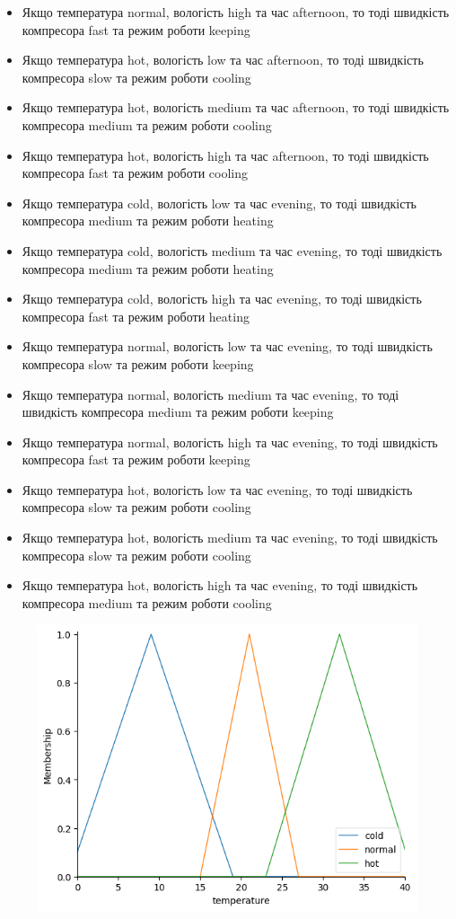 \documentclass{article}
\begin{document}
\begin{itemize}
        \item Якщо температура normal, вологість high та час afternoon, то тоді швидкість компресора fast та режим роботи keeping
        \item Якщо температура hot, вологість low та час afternoon, то тоді швидкість компресора slow та режим роботи cooling
        \item Якщо температура hot, вологість medium та час afternoon, то тоді швидкість компресора medium та режим роботи cooling
        \item Якщо температура hot, вологість high та час afternoon, то тоді швидкість компресора fast та режим роботи cooling
        \item Якщо температура cold, вологість low та час evening, то тоді швидкість компресора medium та режим роботи heating
        \item Якщо температура cold, вологість medium та час evening, то тоді швидкість компресора medium та режим роботи heating
        \item Якщо температура cold, вологість high та час evening, то тоді швидкість компресора fast та режим роботи heating
        \item Якщо температура normal, вологість low та час evening, то тоді швидкість компресора slow та режим роботи keeping
        \item Якщо температура normal, вологість medium та час evening, то тоді швидкість компресора medium та режим роботи keeping
        \item Якщо температура normal, вологість high та час evening, то тоді швидкість компресора fast та режим роботи keeping
        \item Якщо температура hot, вологість low та час evening, то тоді швидкість компресора slow та режим роботи cooling
        \item Якщо температура hot, вологість medium та час evening, то тоді швидкість компресора slow та режим роботи cooling
        \item Якщо температура hot, вологість high та час evening, то тоді швидкість компресора medium та режим роботи cooling
    \end{itemize}

    \begin{figure}[H]
        \centering
        \includegraphics[width=0.6\linewidth]{temperature.png}
    \end{figure}
\end{document}

